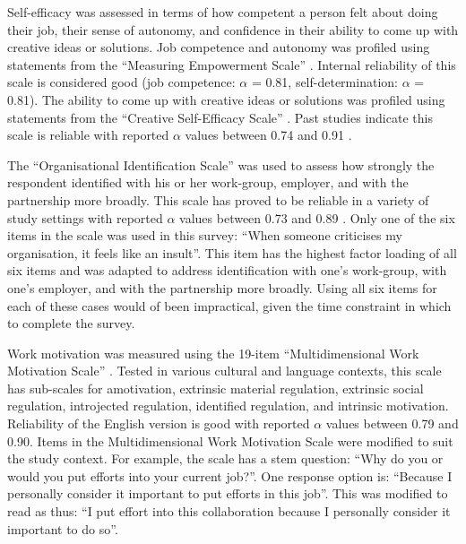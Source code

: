 Self-efficacy was assessed in terms of how competent a person felt about doing their job, their sense of autonomy, and confidence in their ability to come up with creative ideas or solutions. Job competence and autonomy was profiled using statements from the \enquote{Measuring Empowerment Scale} \citep{spreitzer1995psychological}. Internal reliability of this scale is considered good (job competence: $\alpha$ = 0.81, self-determination: $\alpha$ = 0.81). The ability to come up with creative ideas or solutions was profiled using statements from the \enquote{Creative Self-Efficacy Scale} \citep{tierney2002creative}. Past studies indicate this scale is reliable with reported $\alpha$ values between 0.74 and 0.91 \citep{tierney2002creative,gong2009employee,tierney2011creative,mittal2015transformational}.\medskip

The \enquote{Organisational Identification Scale} \citep{mael1992alumni} was used to assess how strongly the respondent identified with his or her work-group, employer, and with the partnership more broadly. This scale has proved to be reliable in a variety of study settings with reported $\alpha$ values between 0.73 and 0.89 \citep{mael1992alumni,bergami2000self,knippenberg2000foci,van2008interactive}. Only one of the six items in the scale was used in this survey: \enquote{When someone criticises my organisation, it feels like an insult}. This item has the highest factor loading of all six items \citep{mael1992identifying} and was adapted to address identification with one's work-group, with one's employer, and with the partnership more broadly. Using all six items for each of these cases would of been impractical, given the time constraint in which to complete the survey.\medskip

Work motivation was measured using the 19-item \enquote{Multidimensional Work Motivation Scale} \citep{gagne2015multidimensional}. Tested in various cultural and language contexts, this scale has sub-scales for amotivation, extrinsic material regulation, extrinsic social regulation, introjected regulation, identified regulation, and intrinsic motivation. Reliability of the English version is good with reported $\alpha$ values between 0.79 and 0.90. Items in the Multidimensional Work Motivation Scale were modified to suit the study context. For example, the scale has a stem question: \enquote{Why do you or would you put efforts into your current job?}. One response option is: \enquote{Because I personally consider it important to put efforts in this job}. This was modified to read as thus: \enquote{I put effort into this collaboration because I personally consider it important to do so}. \medskip

